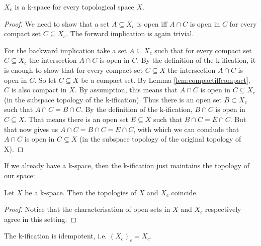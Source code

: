 \begin{lem}\label{lem:kificationiskspace}
    $X_c$ is a k-space for every topological space $X$. 
    \href{https://github.com/scholzhannah/CWComplexes/blob/7be4872a05b534011cc969eb5b80a4b7f0bf57e2/CWcomplexes/KSpace.lean#L245-L258}{\faExternalLink}
\end{lem}
\begin{proof}
    We need to show that a set $A \subseteq X_c$ is open iff $A \cap C$ is open in $C$ for every compact set $C \subseteq X_c$. 
    The forward implication is again trivial. 
    
    For the backward implication take a set $A \subseteq X_c$ such that for every compact set $C \subseteq X_c$ the intersection $A \cap C$ is open in $C$. 
    By the definition of the k-ification, it is enough to show that for every compact set $C \subseteq X$ the intersection $A \cap C$ is open in $C$. So let $C \subseteq X$ be a compact set. 
    By Lemma \ref{lem:compactiffcompact}, $C$ is also compact in $X$.
    By assumption, this means that $A \cap C$ is open in $C \subseteq X_c$ (in the subspace topology of the k-ification). Thus there is an open set $B \subset X_c$ such that $A \cap C = B \cap C$. 
    By the definition of the k-ification, $B \cap C$ is open in $C \subseteq X$. 
    That means there is an open set $E \subseteq X$ such that $B \cap C = E \cap C$. 
    But that now gives us $A \cap C = B \cap C = E \cap C$, with which we can conclude that $A \cap C$ is open in $C \subseteq X$ (in the subspace topology of the original topology of X).
\end{proof}

If we already have a k-space, then the k-ification just maintains the topology of our space:

\begin{lem}\label{lem:kificationkspace}
    Let $X$ be a k-space.
    Then the topologies of $X$ and $X_c$ coincide.
    \href{https://github.com/scholzhannah/CWComplexes/blob/7be4872a05b534011cc969eb5b80a4b7f0bf57e2/CWcomplexes/KSpace.lean#L260-L266}{\faExternalLink}
\end{lem}
\begin{proof}
    Notice that the characterisation of open sets in $X$ and $X_c$ respectively agree in this setting.
\end{proof}

\begin{cor}
    The k-ification is idempotent, i.e. $(X_c)_c = X_c$.
\end{cor}


